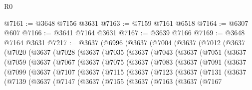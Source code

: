 \begin{lexlean}{R0}
\begin{coremodule}
@7161 := @3648 @7156 @3631
@7163 := @7159 @7161 @6518
@7164 := @6307 @607
@7166 := @3641 @7164 @3631
@7167 := @3639 @7166
@7169 := @3648 @7164 @3631
@7217 := @3637
    (@6996
      (@3637
        (@7004
          (@3637
            (@7012
              (@3637
                (@7020
                  (@3637
                    (@7028
                      (@3637
                        (@7035
                          (@3637
                            (@7043
                              (@3637
                                (@7051
                                  (@3637
                                    (@7059
                                      (@3637
                                        (@7067
                                          (@3637
                                            (@7075
                                              (@3637
                                                (@7083
                                                  (@3637
                                                    (@7091
                                                      (@3637
                                                        (@7099
                                                          (@3637
                                                            (@7107
                                                              (@3637
                                                                (@7115
                                                                  (@3637
                                                                    (@7123
                                                                      (@3637
                                                                        (@7131
                                                                          (@3637
                                                                            (@7139
                                                                              (@3637
                                                                                (@7147
                                                                                  (@3637
                                                                                    (@7155
                                                                                      (@3637
                                                                                        (@7163
                                                                                          (@3637
                                                                                            (@7167

\end{coremodule}
\end{lexlean}

